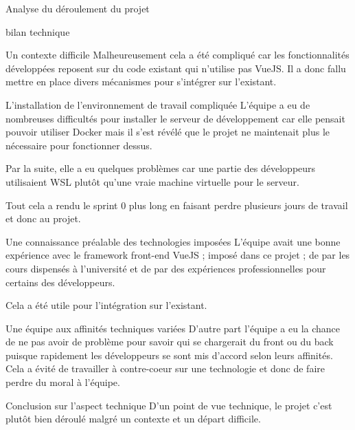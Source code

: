 \documentclass[]{article}
\begin{document}
{\begin{section}{Analyse du déroulement du projet}
\begin{subsection}{bilan technique}
\begin{subsubsection}{Un contexte difficile}
         Malheureusement cela a été compliqué car les fonctionnalités développées reposent sur du code existant qui n'utilise pas VueJS. Il a donc fallu mettre en place divers mécanismes pour s'intégrer sur l'existant.
     \end{subsubsection}

     \begin{subsubsection}{L'installation de l'environnement de travail compliquée}
         L'équipe a eu de nombreuses difficultés pour installer le serveur de développement car elle pensait pouvoir utiliser Docker mais il s'est révélé que le projet ne maintenait plus le nécessaire pour fonctionner dessus.

         Par la suite, elle a eu quelques problèmes car une partie des développeurs utilisaient WSL plutôt qu'une vraie machine virtuelle pour le serveur.

         Tout cela a rendu le sprint 0 plus long en faisant perdre plusieurs jours de travail et donc au projet.
     \end{subsubsection}

     \begin{subsubsection}{Une connaissance préalable des technologies imposées }
         L'équipe avait une bonne expérience avec le framework front-end VueJS ; imposé dans ce projet ; de par les cours dispensés à l'université et de par des expériences professionnelles pour certains des développeurs.

         Cela a été utile pour l'intégration sur l'existant.
     \end{subsubsection}

     \begin{subsubsection}{Une équipe aux affinités techniques variées }
         D'autre part l'équipe a eu la chance de ne pas avoir de problème pour savoir qui se chargerait du front ou du back puisque rapidement les développeurs se sont mis d'accord selon leurs affinités. Cela a évité de travailler à contre-coeur sur une technologie et donc de faire perdre du moral à l'équipe.
     \end{subsubsection}

     \begin{subsubsection}{Conclusion sur l'aspect technique}
        D'un point de vue technique, le projet c'est plutôt bien déroulé malgré un contexte et un départ difficile.
     \end{subsubsection}
 \end{subsection}

\newpage


\end{section}}
\end{document}
